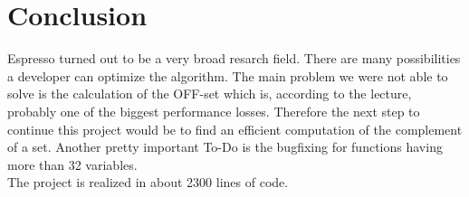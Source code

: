 \documentclass[colorback,accentcolor=tud1c,11pt]{tudreport}
\begin{document}
 \chapter{Conclusion}
 Espresso turned out to be a very broad resarch field. There are many possibilities a developer can optimize the algorithm. The main problem we were not able to solve is the calculation of the OFF-set which is, according to the lecture, probably one of the biggest performance losses. Therefore the next step to continue this project would be to find an efficient computation of the complement of a set. Another pretty important To-Do is the bugfixing for functions having more than 32 variables.
 \\
  The project is realized in about 2300 lines of code.

  
  
\end{document}
